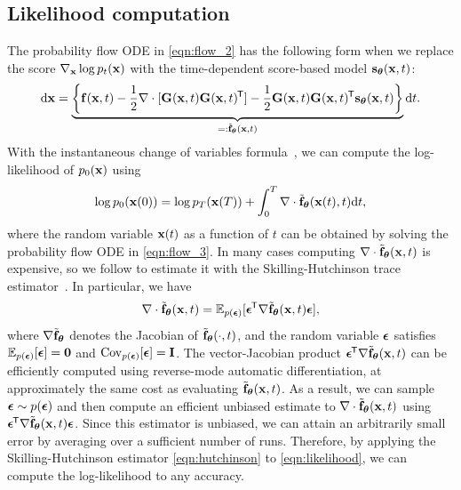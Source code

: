 \subsection{Likelihood computation}\label{app:prob_flow_likelihood}
The probability flow ODE in \cref{eqn:flow_2} has the following form when we replace the score $\nabla_{\mathbf{x}} \log p_t(\mathbf{x})$ with the time-dependent score-based model $\mathbf{s}_{\boldsymbol{\theta}}(\mathbf{x}, t)$:
\begin{align}
      \mathrm{d} \mathbf{x} = \underbrace{\bigg\{\mathbf{f}(\mathbf{x}, t) - \frac{1}{2} \nabla \cdot [\mathbf{G}(\mathbf{x}, t)\mathbf{G}(\mathbf{x}, t)^{\mkern-1.5mu\mathsf{T}}] - \frac{1}{2} \mathbf{G}(\mathbf{x}, t)\mathbf{G}(\mathbf{x}, t)^{\mkern-1.5mu\mathsf{T}} \mathbf{s}_{\boldsymbol{\theta}}(\mathbf{x}, t)\bigg\}}_{=: \tilde{\mathbf{f}}_{\boldsymbol{\theta}}(\mathbf{x}, t)} \mathrm{d} t. \label{eqn:flow_3}
\end{align}
With the instantaneous change of variables formula~\citep{chen2018neural}, we can compute the log-likelihood of $p_0(\mathbf{x})$ using
\begin{align}
    \log p_0(\mathbf{x}(0)) = \log p_T(\mathbf{x}(T)) + \int_0^T \nabla \cdot \tilde{\mathbf{f}}_{\boldsymbol{\theta}}(\mathbf{x}(t), t) \mathrm{d} t, \label{eqn:likelihood}
\end{align}
where the random variable $\mathbf{x}(t)$ as a function of $t$ can be obtained by solving the probability flow ODE in \cref{eqn:flow_3}. In many cases computing $\nabla \cdot \tilde{\mathbf{f}}_{\boldsymbol{\theta}}(\mathbf{x}, t)$ is expensive, so we follow \citet{grathwohl2018ffjord} to estimate it with the Skilling-Hutchinson trace estimator~\citep{skilling1989eigenvalues,hutchinson1990stochastic}. In particular, we have
\begin{align}
    \nabla \cdot \tilde{\mathbf{f}}_{\boldsymbol{\theta}}(\mathbf{x}, t) = \mathbb{E}_{p({\boldsymbol{\epsilon}})}[{\boldsymbol{\epsilon}}^{\mkern-1.5mu\mathsf{T}} \nabla \tilde{\mathbf{f}}_{\boldsymbol{\theta}}(\mathbf{x}, t){\boldsymbol{\epsilon}}], \label{eqn:hutchinson}
\end{align}
where $\nabla \tilde{\mathbf{f}}_{\boldsymbol{\theta}}$ denotes the Jacobian of $\tilde{\mathbf{f}}_{\boldsymbol{\theta}}(\cdot, t)$, and the random variable ${\boldsymbol{\epsilon}}$ satisfies $\mathbb{E}_{p({\boldsymbol{\epsilon}})}[{\boldsymbol{\epsilon}}] = \mathbf{0}$ and $\operatorname{Cov}_{p({\boldsymbol{\epsilon}})}[{\boldsymbol{\epsilon}}] = \mathbf{I}$. The vector-Jacobian product ${\boldsymbol{\epsilon}}^{\mkern-1.5mu\mathsf{T}} \nabla\tilde{\mathbf{f}}_{\boldsymbol{\theta}}(\mathbf{x}, t)$ can be efficiently computed using reverse-mode automatic differentiation, at approximately the same cost as evaluating $\tilde{\mathbf{f}}_{\boldsymbol{\theta}}(\mathbf{x}, t)$. As a result, we can sample ${\boldsymbol{\epsilon}} \sim p({\boldsymbol{\epsilon}})$ and then compute an efficient unbiased estimate to $\nabla \cdot \tilde{\mathbf{f}}_{\boldsymbol{\theta}}(\mathbf{x}, t)$ using ${\boldsymbol{\epsilon}}^{\mkern-1.5mu\mathsf{T}} \nabla \tilde{\mathbf{f}}_{\boldsymbol{\theta}}(\mathbf{x}, t) {\boldsymbol{\epsilon}}$. Since this estimator is unbiased, we can attain an arbitrarily small error by averaging over a sufficient number of runs. Therefore, by applying the Skilling-Hutchinson estimator \cref{eqn:hutchinson} to \cref{eqn:likelihood}, we can compute the log-likelihood to any accuracy.

